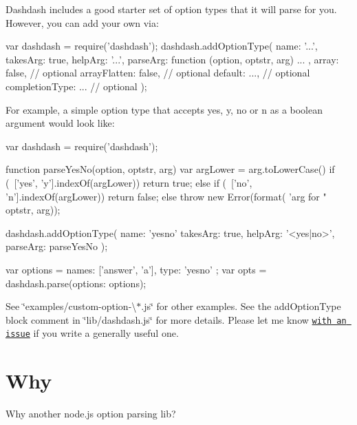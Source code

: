 Dashdash includes a good starter set of option types that it will parse for you. However, you can add your own via\+: \begin{DoxyVerb}var dashdash = require('dashdash');
dashdash.addOptionType({
    name: '...',
    takesArg: true,
    helpArg: '...',
    parseArg: function (option, optstr, arg) {
        ...
    },
    array: false,  // optional
    arrayFlatten: false,  // optional
    default: ...,   // optional
    completionType: ...  // optional
});
\end{DoxyVerb}


For example, a simple option type that accepts \textquotesingle{}yes\textquotesingle{}, \textquotesingle{}y\textquotesingle{}, \textquotesingle{}no\textquotesingle{} or \textquotesingle{}n\textquotesingle{} as a boolean argument would look like\+: \begin{DoxyVerb}var dashdash = require('dashdash');

function parseYesNo(option, optstr, arg) {
    var argLower = arg.toLowerCase()
    if (~['yes', 'y'].indexOf(argLower)) {
        return true;
    } else if (~['no', 'n'].indexOf(argLower)) {
        return false;
    } else {
        throw new Error(format(
            'arg for "%
            optstr, arg));
    }
}

dashdash.addOptionType({
    name: 'yesno'
    takesArg: true,
    helpArg: '<yes|no>',
    parseArg: parseYesNo
});

var options = {
    {names: ['answer', 'a'], type: 'yesno'}
};
var opts = dashdash.parse({options: options});
\end{DoxyVerb}


See \char`\"{}examples/custom-\/option-\/\textbackslash{}$\ast$.\+js\char`\"{} for other examples. See the {\ttfamily add\+Option\+Type} block comment in \char`\"{}lib/dashdash.\+js\char`\"{} for more details. Please let me know \href{https://github.com/trentm/node-dashdash/issues/new}{\tt with an issue} if you write a generally useful one.

\section*{Why}

Why another node.\+js option parsing lib?


